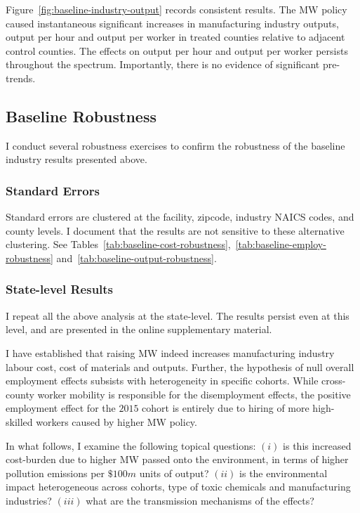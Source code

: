 \documentclass[12pt, english]{article}
\begin{document}
    Figure~\ref{fig:baseline-industry-output} records consistent results. The MW policy caused instantaneous significant increases in manufacturing industry outputs, output per hour and output per worker in treated counties relative to adjacent control counties. The effects on output per hour and output per worker persists throughout the spectrum. Importantly, there is no evidence of significant pre-trends.
    

    \subsection{Baseline Robustness}\label{subsec:baseline-robustness}
    I conduct several robustness exercises to confirm the robustness of the baseline industry results presented above.

    \subsubsection{Standard Errors} Standard errors are clustered at the facility, zipcode, industry NAICS codes, and county levels. I document that the results are not sensitive to these alternative clustering. See Tables~\ref{tab:baseline-cost-robustness},~\ref{tab:baseline-employ-robustness} and~\ref{tab:baseline-output-robustness}.
    
    
    

    \subsubsection{State-level Results} I repeat all the above analysis at the state-level. The results persist even at this level, and are presented in the online supplementary material.

    I have established that raising MW indeed increases manufacturing industry labour cost, cost of materials and outputs. Further, the hypothesis of null overall employment effects subsists with heterogeneity in specific cohorts. While cross-county worker mobility is responsible for the disemployment effects, the positive employment effect for the $2015$ cohort is entirely due to hiring of more high-skilled workers caused by higher MW policy.

    In what follows, I examine the following topical questions: $(i)$ is this increased cost-burden due to higher MW passed onto the environment, in terms of higher pollution emissions per $\$100m$ units of output? $(ii)$ is the environmental impact heterogeneous across cohorts, type of toxic chemicals and manufacturing industries? $(iii)$ what are the transmission mechanisms of the effects?
\end{document}

